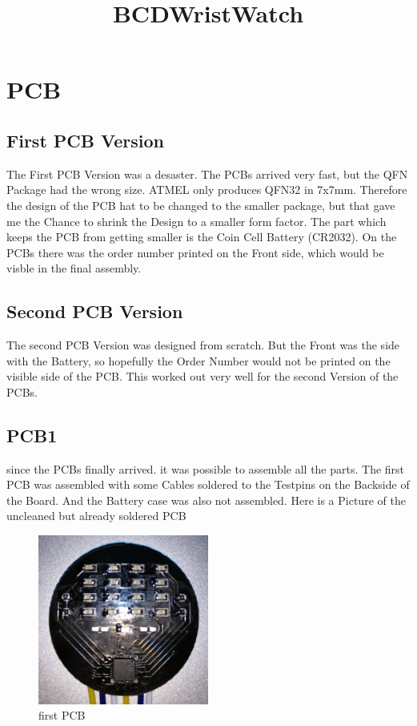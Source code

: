\documentclass[12pt,a4paper,final]{article}
\title{BCDWristWatch}
\date{\vspace{-10ex}}
\begin{document}
\maketitle
\section{PCB}

\subsection{First PCB Version}
The First PCB Version was a desaster. The PCBs arrived very fast, but the QFN Package had the wrong size.
ATMEL only produces QFN32 in 7x7mm. Therefore the design of the PCB hat to be changed to the smaller package,
but that gave me the Chance to shrink the Design to a smaller form factor.
The part which keeps the PCB from getting smaller is the Coin Cell Battery (CR2032).
On the PCBs there was the order number printed on the Front side, which would be visble in the final assembly.
\subsection{Second PCB Version}

The second PCB Version was designed from scratch. But the Front was the side with the Battery, so hopefully the Order Number would not be printed on the visible side of the PCB. This worked out very well for the second Version of the PCBs.
\subsection{PCB1}

since the PCBs finally arrived. it was possible to assemble all the parts.
The first PCB was assembled with some Cables soldered to the Testpins on the Backside of the Board.
And the Battery case was also not assembled.
Here is a Picture of the uncleaned but already soldered PCB
\begin{figure}
\begin{center}
  \includegraphics[width=0.5\textwidth]{../Pictures/PCB1_F1.jpg}
  \caption{first PCB}
\end{center}
\end{figure}
\end{document}
